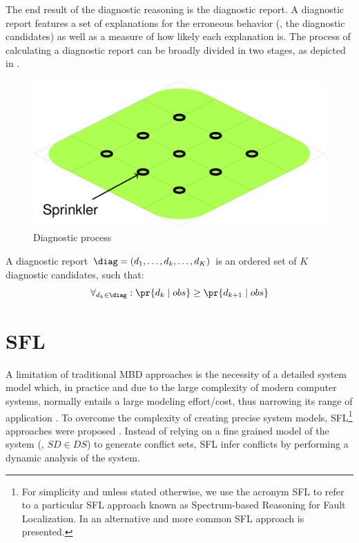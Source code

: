 The end result of the diagnostic reasoning is the diagnostic
report.
%
A diagnostic report features a set of explanations for the erroneous
behavior (\ie, the diagnostic candidates) as well as a measure of how
likely each explanation is.
%
The process of calculating a diagnostic report can be broadly divided
in two stages, as depicted in .

\begin{figure}[ht]
  \includegraphics[page=4]{figures/introduction/figures/main.pdf}
  \caption{Diagnostic process\label{fig:intro:diagnostic-process}}
\end{figure}

\begin{definition}
  \label{def:intro:diagnostic-report}

  A diagnostic report
  $\diag = \left(d_1, \dots, d_k, \dots, d_K\right)$ is an ordered set
  of $K$ diagnostic candidates, such that:
  \begin{equation}
    \forall_{d_k\in \diag} : \pr{d_k \mid obs} \geq \pr{d_{k+1} \mid obs}
  \end{equation}
\end{definition}


\section{\acl{SFL}}
\label{sec:intro:SFL}
A limitation of traditional \ac{MBD} approaches is the necessity of a
detailed system model which, in practice and due to the large
complexity of modern computer systems, normally entails a large
modeling effort/cost, thus narrowing its range of application
\citep{Pietersma06,Horn01}.
%
To overcome the complexity of creating precise system models,
\acf{SFL}\footnote{For simplicity and unless stated otherwise, we use
  the acronym \ac{SFL} to refer to a particular \ac{SFL} approach
  known as Spectrum-based Reasoning for Fault Localization.
  In  an
  alternative and more common \ac{SFL} approach is presented.}
approaches were proposed \citep{Abreu09a,Kleer09,Casanova13}.
%
Instead of relying on a fine grained model of the system (\ie,
$SD \in DS$) to generate conflict sets, \ac{SFL} infer conflicts by
performing a dynamic analysis of the system.

